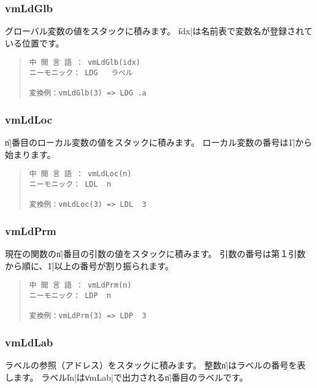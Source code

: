 \subsubsection{vmLdGlb}

グローバル変数の値をスタックに積みます。
\|idx|は名前表で変数名が登録されている位置です。

\begin{quote}
\begin{verbatim}
中 間 言 語 ： vmLdGlb(idx)
ニーモニック： LDG   ラベル

変換例：vmLdGlb(3) => LDG .a
\end{verbatim}
\end{quote}

\subsubsection{vmLdLoc}

\|n|番目のローカル変数の値をスタックに積みます。
ローカル変数の番号は\|1|から始まります。

\begin{quote}
\begin{verbatim}
中 間 言 語 ： vmLdLoc(n)
ニーモニック： LDL  n   

変換例：vmLdLoc(3) => LDL  3
\end{verbatim}
\end{quote}

\subsubsection{vmLdPrm}

現在の関数の\|n|番目の引数の値をスタックに積みます。
引数の番号は第１引数から順に、\|1|以上の番号が割り振られます。

\begin{quote}
\begin{verbatim}
中 間 言 語 ： vmLdPrm(n)
ニーモニック： LDP  n   

変換例：vmLdPrm(3) => LDP  3
\end{verbatim}
\end{quote}

\subsubsection{vmLdLab}

ラベルの参照（アドレス）をスタックに積みます。
整数\|n|はラベルの番号を表します。
ラベル\|ln|は\|vmLab|で出力される\|n|番目のラベルです。

